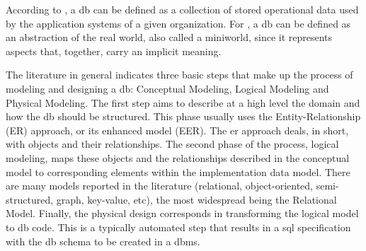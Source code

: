 According to , a \ac{db} can be defined as a collection of stored operational data used by the application systems of a given organization.
For , a \ac{db} can be defined as an abstraction of the real world, also called a miniworld, since it represents aspects that, together, carry an implicit meaning.


The literature in general indicates three basic steps that make up the process of modeling and designing a \ac{db}:
Conceptual Modeling, Logical Modeling and Physical Modeling.
The first step aims to describe at a high level the domain and how the \ac{db} should be structured.
This phase usually uses the Entity-Relationship (ER) approach, or its enhanced model (EER).
The \ac{er} approach deals, in short, with objects and their relationships.
The second phase of the process, logical modeling, maps these objects and the relationships described in the conceptual model to corresponding elements within the implementation data model.
There are many models reported in the literature (relational, object-oriented, semi-structured, graph, key-value, etc), the most widespread being the Relational Model.
Finally, the physical design corresponds in transforming the logical model to \ac{db} code.
This is a typically automated step that results in a \ac{sql} specification with the \ac{db} schema to be created in a \ac{dbms}.

